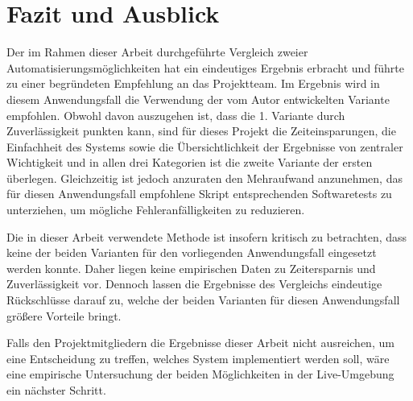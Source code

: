 \chapter{Fazit und Ausblick}
\nocite{*}

Der im Rahmen dieser Arbeit durchgeführte Vergleich zweier Automatisierungsmöglichkeiten hat ein eindeutiges Ergebnis erbracht und führte zu einer begründeten Empfehlung an das Projektteam. Im Ergebnis wird in diesem Anwendungsfall die Verwendung der vom Autor entwickelten Variante empfohlen. Obwohl davon auszugehen ist, dass die 1. Variante durch Zuverlässigkeit punkten kann, sind für dieses Projekt die Zeiteinsparungen, die Einfachheit des Systems sowie die Übersichtlichkeit der Ergebnisse von zentraler Wichtigkeit und in allen drei Kategorien ist die zweite Variante der ersten überlegen. Gleichzeitig ist jedoch anzuraten den Mehraufwand anzunehmen, das für diesen Anwendungsfall empfohlene Skript entsprechenden Softwaretests zu unterziehen, um mögliche Fehleranfälligkeiten zu reduzieren. 
\newline


Die in dieser Arbeit verwendete Methode ist insofern kritisch zu betrachten, dass keine der beiden Varianten für den vorliegenden Anwendungsfall eingesetzt werden konnte. Daher liegen keine empirischen Daten zu Zeitersparnis und Zuverlässigkeit vor. Dennoch lassen die Ergebnisse des Vergleichs eindeutige Rückschlüsse darauf zu, welche der beiden Varianten für diesen Anwendungsfall größere Vorteile bringt.
\newline


Falls den Projektmitgliedern die Ergebnisse dieser Arbeit nicht ausreichen, um eine Entscheidung zu treffen, welches System implementiert werden soll, wäre eine empirische Untersuchung der beiden Möglichkeiten in der Live-Umgebung ein nächster Schritt.

